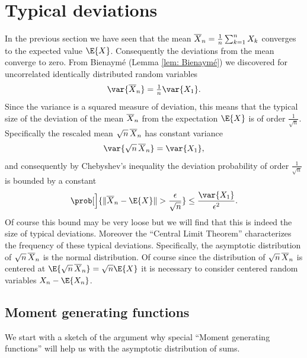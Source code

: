 \section{Typical deviations}

In the previous section we have seen that the mean \(\overline{X}_n =
\frac1n\sum_{k=1}^n X_k\) converges to the expected value \(\E{X}\).
Consequently the deviations from the mean converge to zero. From Bienaymé (Lemma
\ref{lem: Bienaymé}) we discovered for uncorrelated identically distributed
random variables
\[
    \var{\mean{X}_n} = \tfrac1n \var{X_1}.
\]
Since the variance is a squared measure of deviation, this means
that the typical size of the deviation of the mean \(\overline{X}_n\) from the expectation
\(\E{X}\) is of order \(\frac1{\sqrt{n}}\).
Specifically the rescaled mean \(\sqrt{n}\,\overline{X}_n\) has
constant variance
\[
    \var{\sqrt{n}\,\mean{X}_n} = \var{X_1},
\]
and consequently by Chebyshev's inequality the deviation probability of order \(\frac{1}{\sqrt{n}}\) is
bounded by a constant
\[
    \prob[\Big]{\norm{\mean{X}_n - \E{X}} > \frac{\epsilon}{\sqrt{n}}}
    \le \frac{\var{X_1}}{\epsilon^2}.
\]
Of course this bound may be very loose but we will find that this is indeed
the size of typical deviations. Moreover the ``Central Limit Theorem''
characterizes the frequency of these typical deviations. Specifically, the asymptotic distribution of \(\sqrt{n}\,
\overline{X}_n\) is the normal distribution. Of course since the distribution of
\(\sqrt{n}\, \overline{X}_n\) is centered at \(\E{\sqrt{n}\, \mean{X}_n} = \sqrt{n}
\E{X}\) it is necessary to consider centered random variables \(X_n -
\E{X_n}\).


\subsection{Moment generating functions}
\label{sec: moment generating functions}

We start with a sketch of the argument why special ``Moment generating
functions'' will help us with the asymptotic distribution of sums.

